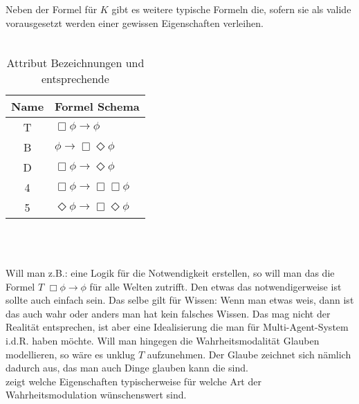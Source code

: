Neben der Formel für $K$ gibt es weitere typische Formeln die, sofern sie als valide vorausgesetzt werden einer \NML gewissen Eigenschaften verleihen.\\
\\
%
\begin{table}
	\label{tab:attributes}
	\centering
	\begin{tabular}{cl}
	\hline
	\hline
	Name & Formel Schema\\
	\hline
	T & $\Box \phi \rightarrow \phi$\\
	B & $\phi \rightarrow \Box \Diamond\phi$\\
	D & $\Box \phi \rightarrow \Diamond \phi$\\
	4 & $\Box \phi \rightarrow \Box \Box \phi$\\
	5 & $\Diamond \phi \rightarrow \Box \Diamond \phi$\\
	\hline
	\end{tabular}\\
	\caption{Attribut Bezeichnungen und entsprechende \formelSchemata}
\end{table}
\\
Will man z.B.: eine Logik für die Notwendigkeit erstellen, so will man das die Formel $T$ $\Box \phi \rightarrow \phi$ für alle Welten zutrifft.
Den etwas das notwendigerweise \true ist sollte auch einfach \true sein.
Das selbe gilt für Wissen: Wenn man etwas weis, dann ist das auch wahr oder anders man hat kein falsches Wissen.
Das mag nicht der Realität entsprechen, ist aber eine Idealisierung die man für Multi-Agent-System i.d.R. haben möchte.
Will man hingegen die Wahrheitsmodalität Glauben modellieren, so wäre es unklug $T$ aufzunehmen.
Der Glaube zeichnet sich nämlich dadurch aus, das man auch Dinge glauben kann die \false sind.\\
 zeigt welche Eigenschaften typischerweise für welche Art der Wahrheitsmodulation wünschenswert sind.\\
%
